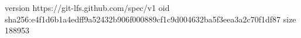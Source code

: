 version https://git-lfs.github.com/spec/v1
oid sha256:e4f1d6b1a4edff9a52432b906f000889cf1c9d004632ba5f3eea3a2c70f1df87
size 188953
